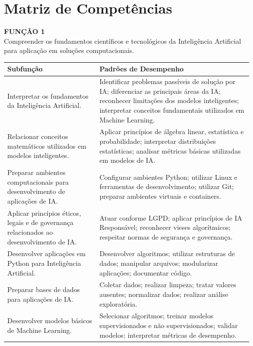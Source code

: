 \section{Matriz de Competências}

\vspace{0.5cm}

\textbf{FUNÇÃO 1} \\
Compreender os fundamentos científicos e tecnológicos da Inteligência Artificial para aplicação em soluções computacionais.

\begin{table}[htb]
\centering
\small
\renewcommand{\arraystretch}{1.1}
\begin{tabular}{|p{6cm}|p{10cm}|}
\hline
\textbf{Subfunção} & \textbf{Padrões de Desempenho} \\
\hline
Interpretar os fundamentos da Inteligência Artificial. & Identificar problemas passíveis de solução por IA; diferenciar as principais áreas da IA; reconhecer limitações dos modelos inteligentes; interpretar conceitos fundamentais utilizados em Machine Learning. \\
\hline
Relacionar conceitos matemáticos utilizados em modelos inteligentes. & Aplicar princípios de álgebra linear, estatística e probabilidade; interpretar distribuições estatísticas; analisar métricas básicas utilizadas em modelos de IA. \\
\hline
Preparar ambientes computacionais para desenvolvimento de aplicações de IA. & Configurar ambientes Python; utilizar Linux e ferramentas de desenvolvimento; utilizar Git; preparar ambientes virtuais e containers. \\
\hline
Aplicar princípios éticos, legais e de governança relacionados ao desenvolvimento de IA. & Atuar conforme LGPD; aplicar princípios de IA Responsável; reconhecer vieses algorítmicos; respeitar normas de segurança e governança. \\
\hline
Desenvolver aplicações em Python para Inteligência Artificial. & Desenvolver algoritmos; utilizar estruturas de dados; manipular arquivos; modularizar aplicações; documentar código. \\
\hline
Preparar bases de dados para aplicações de IA. & Coletar dados; realizar limpeza; tratar valores ausentes; normalizar dados; realizar análise exploratória. \\
\hline
Desenvolver modelos básicos de Machine Learning. & Selecionar algoritmos; treinar modelos supervisionados e não supervisionados; validar modelos; interpretar métricas de desempenho. \\

\end{tabular}
\end{table}
